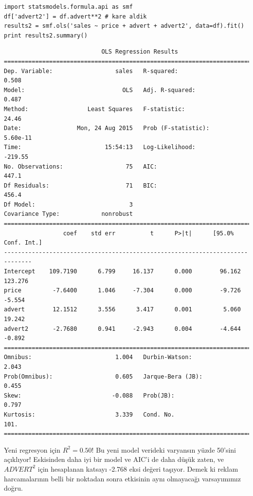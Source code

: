 \documentclass[12pt,fleqn]{article}\usepackage{../../common}
\begin{document}
\begin{verbatim}
import statsmodels.formula.api as smf
df['advert2'] = df.advert**2 # kare aldik
results2 = smf.ols('sales ~ price + advert + advert2', data=df).fit()
print results2.summary()
\end{verbatim}

\begin{verbatim}
                            OLS Regression Results                            
==============================================================================
Dep. Variable:                  sales   R-squared:                       0.508
Model:                            OLS   Adj. R-squared:                  0.487
Method:                 Least Squares   F-statistic:                     24.46
Date:                Mon, 24 Aug 2015   Prob (F-statistic):           5.60e-11
Time:                        15:54:13   Log-Likelihood:                -219.55
No. Observations:                  75   AIC:                             447.1
Df Residuals:                      71   BIC:                             456.4
Df Model:                           3                                         
Covariance Type:            nonrobust                                         
==============================================================================
                 coef    std err          t      P>|t|      [95.0% Conf. Int.]
------------------------------------------------------------------------------
Intercept    109.7190      6.799     16.137      0.000        96.162   123.276
price         -7.6400      1.046     -7.304      0.000        -9.726    -5.554
advert        12.1512      3.556      3.417      0.001         5.060    19.242
advert2       -2.7680      0.941     -2.943      0.004        -4.644    -0.892
==============================================================================
Omnibus:                        1.004   Durbin-Watson:                   2.043
Prob(Omnibus):                  0.605   Jarque-Bera (JB):                0.455
Skew:                          -0.088   Prob(JB):                        0.797
Kurtosis:                       3.339   Cond. No.                         101.
==============================================================================

\end{verbatim}

Yeni regresyon için $R^2=0.50$! Bu yeni model verideki varyansın yüzde
50'sini açıklıyor! Eskisinden daha iyi bir model ve AIC'i de daha düşük
zaten, ve $ADVERT^2$ için hesaplanan katsayı -2.768 eksi değeri
taşıyor. Demek ki reklam harcamalarının belli bir noktadan sonra etkisinin
aynı olmayacağı varsayımımız doğru. 
\end{document}
